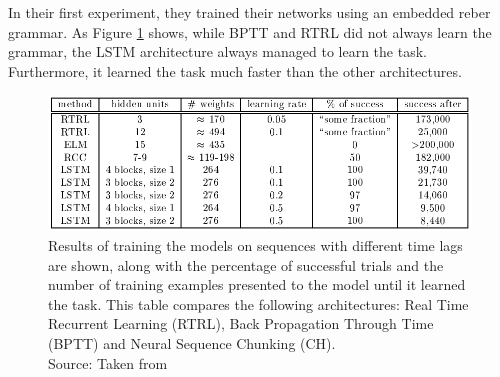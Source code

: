 \documentclass[twoside,a4paper,10pt,DIV=12,BCOR=12mm]{scrartcl}
\begin{document}
In their first experiment, they trained their networks using an embedded reber grammar. As Figure \ref{fig:exp1res} shows, while BPTT and RTRL did not always learn the grammar, the LSTM architecture always managed to learn the task. Furthermore, it learned the task much faster than the other architectures.\cite{hochreiter1997lstm}
\begin{figure}
    \centering
    \includegraphics[width=0.75\linewidth]{ResultsTask1.png}
    \caption{Results of training the models on sequences with different time lags are shown, along with the percentage of successful trials and the number of training examples presented to the model until it learned the task. This table compares the following architectures: Real Time Recurrent Learning (RTRL), Back Propagation Through Time (BPTT) and Neural Sequence Chunking (CH). \\ Source: Taken from \cite{hochreiter1997lstm}}
    \label{fig:exp1res}
\end{figure}
\end{document}
